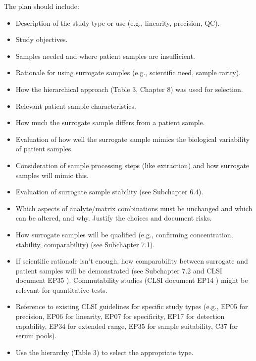 \documentclass{article}
\begin{document}
The plan should include:
\begin{itemize}
    \item Description of the study type or use (e.g., linearity, precision, QC).
    \item Study objectives.
    \item Samples needed and where patient samples are insufficient.
    \item Rationale for using surrogate samples (e.g., scientific need, sample rarity).
    \item How the hierarchical approach (Table 3, Chapter 8) was used for selection.
    \item Relevant patient sample characteristics.
    \item How much the surrogate sample differs from a patient sample.
    \item Evaluation of how well the surrogate sample mimics the biological variability of patient samples.
    \item Consideration of sample processing steps (like extraction) and how surrogate samples will mimic this.
    \item Evaluation of surrogate sample stability (see Subchapter 6.4).
    \item Which aspects of analyte/matrix combinations must be unchanged and which can be altered, and why. Justify the choices and document risks.
    \item How surrogate samples will be qualified (e.g., confirming concentration, stability, comparability) (see Subchapter 7.1).
    \item If scientific rationale isn't enough, how comparability between surrogate and patient samples will be demonstrated (see Subchapter 7.2 and CLSI document EP35 \cite{CLSIEP35}). Commutability studies (CLSI document EP14 \cite{CLSIEP14}) might be relevant for quantitative tests.
    \item Reference to existing CLSI guidelines for specific study types (e.g., EP05 \cite{CLSIEP05} for precision, EP06 \cite{CLSIEP06} for linearity, EP07 \cite{CLSIEP07} for specificity, EP17 \cite{CLSIEP17} for detection capability, EP34 \cite{CLSIEP34} for extended range, EP35 \cite{CLSIEP35} for sample suitability, C37 \cite{CLSIC37} for serum pools).
    \item Use the hierarchy (Table 3) to select the appropriate type.
\end{itemize}
\end{document}

